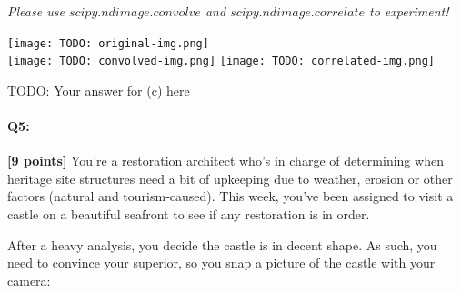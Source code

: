 \begin{enumerate}[(a)]
    \emph{Please use \href{https://docs.scipy.org/doc/scipy/reference/generated/scipy.ndimage.convolve.html}{$scipy.ndimage.convolve$} and \href{https://docs.scipy.org/doc/scipy/reference/generated/scipy.ndimage.correlate.html}{$scipy.ndimage.correlate$} to experiment!}
    

\begin{tcolorbox}[colback=white!5!white,colframe=green!75!black]
    \texttt{[image: TODO: original-img.png]}\\
    \texttt{[image: TODO: convolved-img.png]}
    \texttt{[image: TODO: correlated-img.png]}
    
    \begin{mdframed}
        TODO: Your answer for (c) here
    \end{mdframed}
\end{tcolorbox}

\end{enumerate}





\pagebreak

\paragraph{Q5:} \textbf{[9 points]} You're a restoration architect who's in charge of determining when heritage site structures need a bit of upkeeping due to weather, erosion or other factors (natural and tourism-caused). This week, you've been assigned to visit a castle on a beautiful seafront to see if any restoration is in order.

After a heavy analysis, you decide the castle is in decent shape. As such, you need to convince your superior, so you snap a picture of the castle with your camera:

